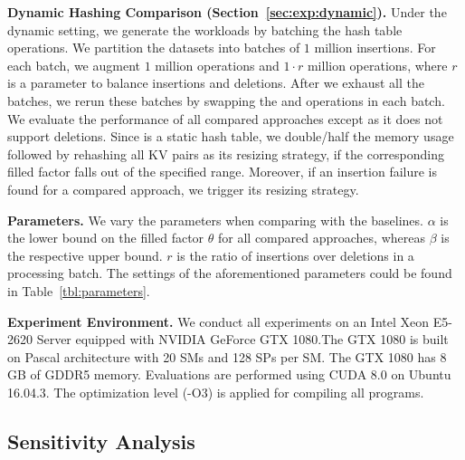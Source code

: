 \vspace{1mm}\noindent\textbf{Dynamic Hashing Comparison (Section~\ref{sec:exp:dynamic}).}
Under the dynamic setting, we generate the workloads by batching the hash table operations. 
We partition the datasets into batches of $1$ million insertions. 
For each batch, we augment $1$ million  operations and $1 \cdot r$ million  operations,
where $r$ is a parameter to balance insertions and deletions.
After we exhaust all the batches, we rerun these batches by swapping the  and  operations in each batch. 
We evaluate the performance of all compared approaches except \cudpp as it does not support deletions. 
Since \megakv is a static hash table, we double/half the memory usage followed by rehashing all KV pairs as its resizing strategy, if the corresponding filled factor falls out of the specified range. 
Moreover, if an insertion failure is found for a compared approach, we trigger its resizing strategy.



\vspace{1mm}\noindent\textbf{Parameters.}
We vary the parameters when comparing \voter with the baselines.
$\alpha$ is the lower bound on the filled factor $\theta$ for all compared approaches,
whereas $\beta$ is the respective upper bound.
$r$ is the ratio of insertions over deletions in a processing batch. 
The settings of the aforementioned parameters could be found in Table~\ref{tbl:parameters}.

\vspace{1mm}\noindent\textbf{Experiment Environment.}
We conduct all experiments on an Intel Xeon E5-2620 Server equipped with NVIDIA GeForce GTX 1080.The GTX 1080 is built on Pascal architecture with 20 SMs and 128 SPs per SM. The GTX 1080 has 8 GB of GDDR5 memory. Evaluations are performed using CUDA 8.0 on Ubuntu 16.04.3. The optimization level (-O3) is applied for compiling all programs.





\subsection{Sensitivity Analysis}\label{sec:exp:tune}


